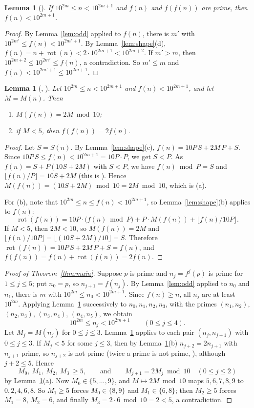 \documentclass[11pt]{amsart}
\theoremstyle{plain}
\newtheorem{lemma}[theorem]{Lemma}
\theoremstyle{definition}
\DeclareMathOperator{\rot}{rot}
\begin{document}
\begin{lemma}[]\label{lem:stay}
If $10^{2m}\le n<10^{2m+1}$ and $f(n)$ and $f(f(n))$ are prime, then $f(n)<10^{2m+1}$.
\end{lemma}

\begin{proof}
By Lemma~\ref{lem:odd} applied to $f(n)$, there is $m'$ with $10^{2m'}\le f(n)<10^{2m'+1}$. By Lemma~\ref{lem:shape}(d), $f(n)=n+\rot(n)<2\cdot10^{2m+1}<10^{2m+2}$. If $m'>m$, then $10^{2m+2}\le10^{2m'}\le f(n)$, a contradiction. So $m'\le m$ and $f(n)<10^{2m'+1}\le10^{2m+1}$.
\end{proof}

\begin{lemma}[, ]\label{lem:mid}
Let $10^{2m}\le n<10^{2m+1}$ and $f(n)<10^{2m+1}$, and let $M=M(n)$. Then
\begin{enumerate}
\item[(a)] $M(f(n))=2M\bmod10$;
\item[(b)] if $M<5$, then $f(f(n))=2f(n)$.
\end{enumerate}
\end{lemma}

\begin{proof}
Let $S=S(n)$. By Lemma~\ref{lem:shape}(c), $f(n)=10P\,S+2M\,P+S$. Since $10P\,S\le f(n)<10^{2m+1}=10P\cdot P$, we get $S<P$. As $f(n)=S+P(10S+2M)$ with $S<P$, we have $f(n)\bmod P=S$ and $\lfloor f(n)/P\rfloor=10S+2M$ (this is ). Hence $M(f(n))=(10S+2M)\bmod10=2M\bmod10$, which is (a).

For (b), note that $10^{2m}\le n\le f(n)<10^{2m+1}$, so Lemma~\ref{lem:shape}(b) applies to $f(n)$:
\[
  \rot(f(n))=10P\cdot\bigl(f(n)\bmod P\bigr)+P\cdot M(f(n))+\lfloor f(n)/10P\rfloor .
\]
If $M<5$, then $2M<10$, so $M(f(n))=2M$ and $\lfloor f(n)/10P\rfloor=\lfloor(10S+2M)/10\rfloor=S$. Therefore $\rot(f(n))=10P\,S+2M\,P+S=f(n)$, and $f(f(n))=f(n)+\rot(f(n))=2f(n)$.
\end{proof}

\begin{proof}[Proof of Theorem~\ref{thm:main}]
Suppose $p$ is prime and $n_j=f^j(p)$ is prime for $1\le j\le5$; put $n_0=p$, so $n_{j+1}=f(n_j)$. By Lemma~\ref{lem:odd} applied to $n_0$ and $n_1$, there is $m$ with $10^{2m}\le n_0<10^{2m+1}$. Since $f(n)\ge n$, all $n_j$ are at least $10^{2m}$. Applying Lemma~\ref{lem:stay} successively to $n_0,n_1,n_2,n_3$, with the primes $(n_1,n_2)$, $(n_2,n_3)$, $(n_3,n_4)$, $(n_4,n_5)$, we obtain
\[
  10^{2m}\le n_j<10^{2m+1}\qquad(0\le j\le4).
\]
Let $M_j=M(n_j)$ for $0\le j\le3$. Lemma~\ref{lem:mid} applies to each pair $(n_j,n_{j+1})$ with $0\le j\le3$. If $M_j<5$ for some $j\le3$, then by Lemma~\ref{lem:mid}(b) $n_{j+2}=2n_{j+1}$ with $n_{j+1}$ prime, so $n_{j+2}$ is not prime (twice a prime is not prime, ), although $j+2\le5$. Hence
\[
  M_0,\ M_1,\ M_2,\ M_3\ \ge5,\qquad\text{and}\qquad M_{j+1}=2M_j\bmod10\quad(0\le j\le2)
\]
by Lemma~\ref{lem:mid}(a). Now $M_0\in\{5,\dots,9\}$, and $M\mapsto2M\bmod10$ maps $5,6,7,8,9$ to $0,2,4,6,8$. So $M_1\ge5$ forces $M_0\in\{8,9\}$ and $M_1\in\{6,8\}$; then $M_2\ge5$ forces $M_1=8$, $M_2=6$, and finally $M_3=2\cdot6\bmod10=2<5$, a contradiction.
\end{proof}
\end{document}

